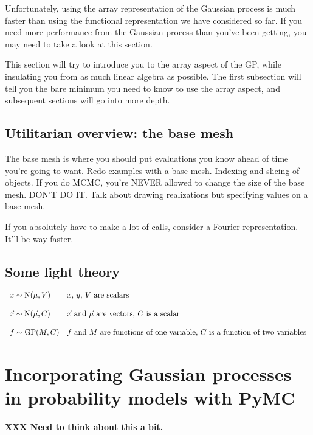 \documentclass{manual}
\begin{document}
Unfortunately, using the array representation of the Gaussian process is much faster than using the functional representation we have considered so far. If you need more performance from the Gaussian process than you've been getting, you may need to take a look at this section.

This section will try to introduce you to the array aspect of the GP, while insulating you from as much linear algebra as possible. The first subsection will tell you the bare minimum you need to know to use the array aspect, and subsequent sections will go into more depth.

\subsection{Utilitarian overview: the base mesh}

The base mesh is where you should put evaluations you know ahead of time you're going to want. Redo examples with a base mesh. Indexing and slicing of objects. If you do MCMC, you're NEVER allowed to change the size of the base mesh. DON'T DO IT. Talk about drawing realizations but specifying values on a base mesh.

If you absolutely have to make a lot of calls, consider a Fourier representation. It'll be way faster.

\subsection{Some light theory} 

\begin{equation}
    \begin{array}{ll}
        x\sim\textup N(\mu,V) & \textup{$x$, $y$, $V$ are scalars}\\\\
        \vec x\sim\textup N(\vec \mu,C)& \textup{$\vec x$ and $\vec \mu$ are vectors, $C$ is a scalar}\\\\
        f\sim\textup{GP}(M, C) & \textup{$f$ and $M$ are functions of one variable, $C$ is a function of two variables}
    \end{array}
\end{equation}


\section{Incorporating Gaussian processes in probability models with PyMC}\label{sec:PyMC} %
\textbf{XXX Need to think about this a bit.}
\end{document}
